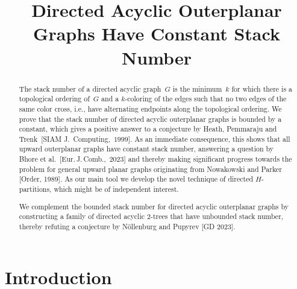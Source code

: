 \documentclass{theoretics}
\title{Directed Acyclic Outerplanar Graphs Have Constant Stack Number}
\begin{document}
\maketitle

\begin{abstract}
    The stack number of a directed acyclic graph~$G$ is the minimum~$k$ for which there is a topological ordering of~$G$ and a $k$-coloring of the edges such that no two edges of the same color cross, i.e., have alternating endpoints along the topological ordering.
    We prove that the stack number of directed acyclic outerplanar graphs
    is bounded by a constant, which gives a positive answer to a conjecture by Heath, Pemmaraju and Trenk~[SIAM J.\ Computing,~$1999$].
    As an immediate consequence, this shows that all upward outerplanar graphs have constant stack number, answering a question by Bhore et al.~[Eur.\,J.\,Comb.,~2023] and thereby making significant progress towards the problem for general upward planar graphs originating from Nowakowski and Parker [Order, 1989]. 
    As our main tool we develop the novel technique of directed $H$-partitions, which might be of independent interest.

    We complement the bounded stack number for directed acyclic outerplanar graphs by constructing a family of directed acyclic $2$-trees that have unbounded stack number, 
    thereby refuting a conjecture by Nöllenburg and Pupyrev [GD 2023].
\end{abstract}


\section{Introduction}
\end{document}
